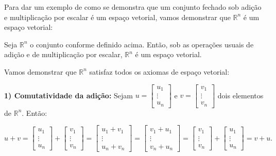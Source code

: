 Para dar um exemplo de como se demonstra que um conjunto fechado sob adição e multiplicação por escalar é um espaço vetorial, vamos demonstrar que $\mathbb{R}^n$ é um espaço vetorial:

\begin{Proposition}
	Seja $\mathbb{R}^n$ o conjunto conforme definido acima. Então, sob as operações usuais de adição e de multiplicação por escalar, $\mathbb{R}^n$ é um espaço vetorial.
\end{Proposition}

\begin{Proof}
	Vamos demonstrar que $\mathbb{R}^n$ satisfaz todos os axiomas de espaço vetorial:
	
	\textbf{1) Comutatividade da adição:} Sejam $u = \begin{bmatrix}
		u_1 \\
		\vdots \\
		u_n
	\end{bmatrix}$ e $v = \begin{bmatrix}
		v_1 \\
		\vdots \\
		v_n
	\end{bmatrix}$ dois elementos de $\mathbb{R}^n$. Então:
	
	$$
	u + v = \begin{bmatrix}
		u_1 \\
		\vdots \\
		u_n
	\end{bmatrix} + \begin{bmatrix}
		v_1 \\
		\vdots \\
		v_n
	\end{bmatrix} = \begin{bmatrix}
		u_1 + v_1 \\
		\vdots \\
		u_n + v_n
	\end{bmatrix} = \begin{bmatrix}
		v_1 + u_1 \\
		\vdots \\
		v_n + u_n
	\end{bmatrix} = \begin{bmatrix}
		v_1 \\
		\vdots \\
		v_n
	\end{bmatrix} + \begin{bmatrix}
		u_1 \\
		\vdots \\
		u_n
	\end{bmatrix} = v + u.
	$$ 
	

\end{Proof}
